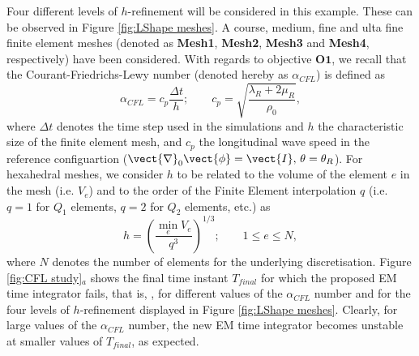 Four different levels of $h$-refinement will be considered in this example. These can be observed in Figure \ref{fig:LShape meshes}. A course, medium,  fine and ulta fine finite element meshes (denoted as \textbf{Mesh1}, \textbf{Mesh2}, \textbf{Mesh3} and \textbf{Mesh4}, respectively) have been considered. With regards to objective $\textbf{O1}$,  we recall that the Courant-Friedrichs-Lewy number (denoted hereby as $\alpha_{CFL}$) is defined as
%
\begin{equation}\label{eqn:CFL}
\alpha_{CFL}=c_p\frac{\Delta t}{h};\qquad c_p=\sqrt{\frac{\lambda_R + 2\mu_R}{\rho_0}},
\end{equation}
%
where $\Delta t$ denotes the time step used in the simulations and $h$ the characteristic size of the finite element mesh, and $c_p$ the longitudinal wave speed in the reference configuartion ($\vect{\nabla}_0\vect{\phi}=\vect{I},\,\theta=\theta_R$). For hexahedral meshes, we consider $h$ to be related to the volume of the element $e$ in the mesh  (i.e. $V_e$) and to the order of the Finite Element interpolation $q$ (i.e. $q=1$ for $Q_1$ elements, $q=2$ for $Q_2$ elements, etc.) as
%
\begin{equation}
h = \left(\frac{\min\limits_{e}V_{e}}{q^3}\right)^{1/3};\qquad 1\leq e \leq N, 
\end{equation}
%
where $N$ denotes the number of elements for the underlying discretisation. 
Figure \ref{fig:CFL study}$_a$ shows the final time instant $T_{final}$ for which the proposed EM time integrator fails, that is, , for different values of the $\alpha_{CFL}$ number and for the four levels of $h$-refinement displayed in Figure \ref{fig:LShape meshes}. Clearly, for large values of the $\alpha_{CFL}$ number, the new EM time integrator becomes unstable at smaller values of $T_{final}$, as expected. 


